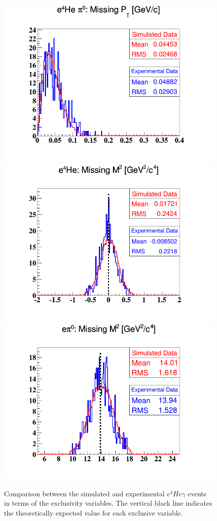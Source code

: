 \begin{figure}[h!]
\includegraphics[scale=0.35]{fig_dvcs/comp/Coh_pi0_e4Hepi0_PT_Mis.png}
\includegraphics[scale=0.35]{fig_dvcs/comp/Coh_pi0_e4He_M2_Mis.png}
\includegraphics[scale=0.35]{fig_dvcs/comp/Coh_pi0_epi0_M2_Mis.png}
\caption{Comparison between the simulated and experimental $e^{4}He\gamma$ events in terms of the exclusivity variables. The vertical black line indicates the theoretically expected value for each exclusive variable.} 
\label{fig:coh_pi0_comparison_with_simulation_2}
\end{figure}

